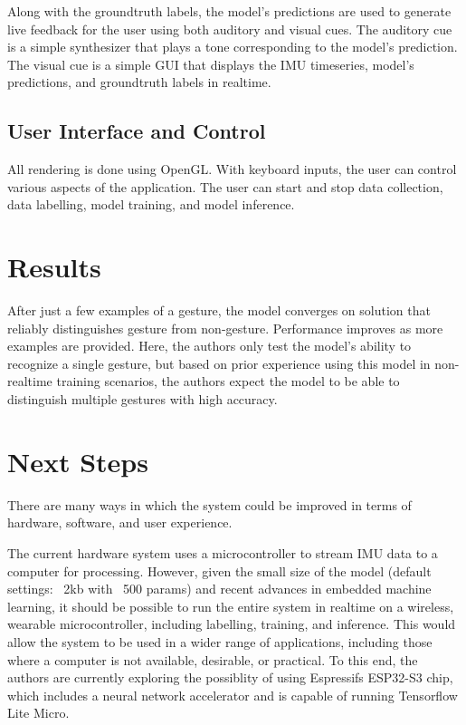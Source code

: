 \documentclass{article}
\begin{document}
Along with the groundtruth labels, the model's predictions are used to generate live feedback for the user using both auditory and visual cues. The auditory cue is a simple synthesizer that plays a tone corresponding to the model's prediction. The visual cue is a simple GUI that displays the IMU timeseries, model's predictions, and groundtruth labels in realtime.

\subsection{User Interface and Control}
All rendering is done using OpenGL. With keyboard inputs, the user can control various aspects of the application. The user can start and stop data collection, data labelling, model training, and model inference.

\section{Results}
After just a few examples of a gesture, the model converges on solution that reliably distinguishes gesture from non-gesture. Performance improves as more examples are provided. Here, the authors only test the model's ability to recognize a single gesture, but based on prior experience using this model in non-realtime training scenarios, the authors expect the model to be able to distinguish multiple gestures with high accuracy.

\section{Next Steps}
There are many ways in which the system could be improved in terms of hardware, software, and user experience.

The current hardware system uses a microcontroller to stream IMU data to a computer for processing. However, given the small size of the model (default settings: ~2kb with ~500 params) and recent advances in embedded machine learning, it should be possible to run the entire system in realtime on a wireless, wearable microcontroller, including labelling, training, and inference. This would allow the system to be used in a wider range of applications, including those where a computer is not available, desirable, or practical. To this end, the authors are currently exploring the possiblity of using Espressifs ESP32-S3 chip, which includes a neural network accelerator and is capable of running Tensorflow Lite Micro.
\end{document}
